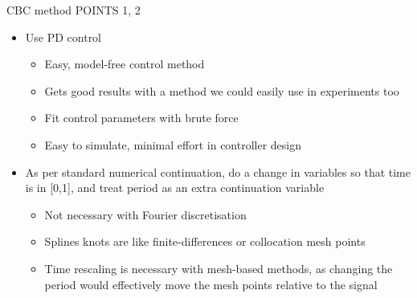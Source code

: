 \documentclass[presentation]{beamer}
\begin{document}
\begin{frame}[plain,label={sec:orgad84812}]{CBC method POINTS 1, 2}
\begin{itemize}
\item Use PD control
\begin{itemize}
\item Easy, model-free control method
\item Gets good results with a method we could easily use in experiments too
\item Fit control parameters with brute force
\item Easy to simulate, minimal effort in controller design
\end{itemize}

\item As per standard numerical continuation, do a change in variables so that time is in [0,1], and treat period as an extra continuation variable
\begin{itemize}
\item Not necessary with Fourier discretisation
\item Splines knots are like finite-differences or collocation mesh points
\item Time rescaling is necessary with mesh-based methods, as changing the period would effectively move the mesh points relative to the signal
\end{itemize}
\end{itemize}
\end{frame}
\end{document}
